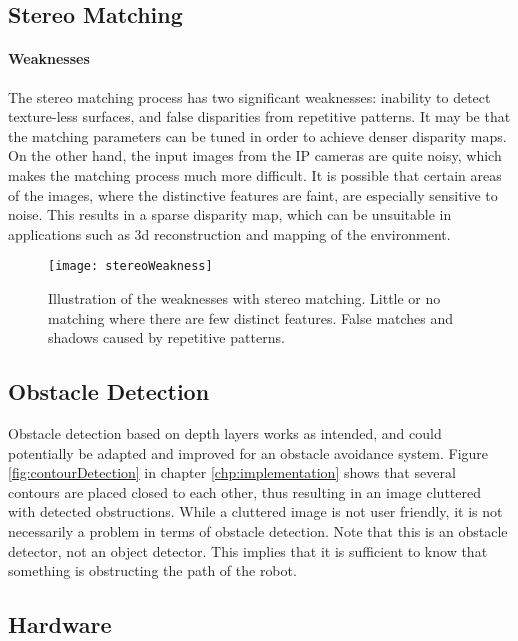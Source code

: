 \subsection{Stereo Matching}

\paragraph{Weaknesses}

The stereo matching process has two significant weaknesses: inability to detect texture-less surfaces, and false disparities from repetitive patterns. It may be that the matching parameters can be tuned in order to achieve denser disparity maps. On the other hand, the input images from the IP cameras are quite noisy, which makes the matching process much more difficult. It is possible that certain areas of the images, where the distinctive features are faint, are especially sensitive to noise. This results in a sparse disparity map, which can be unsuitable in applications such as 3d reconstruction and mapping of the environment.

\begin{figure}
	\texttt{[image: stereoWeakness]}
	\caption{Illustration of the weaknesses with stereo matching. Little or no matching where there are few distinct features. False matches and shadows caused by repetitive patterns.}
	\label{fig:stereoWeakness}
\end{figure}



\subsection{Obstacle Detection}

Obstacle detection based on depth layers works as intended, and could potentially be adapted and improved for an obstacle avoidance system. Figure \ref{fig:contourDetection} in chapter \ref{chp:implementation} shows that several contours are placed closed to each other, thus resulting in an image cluttered with detected obstructions. While a cluttered image is not user friendly, it is not necessarily a problem in terms of obstacle detection. Note that this is an obstacle detector, not an object detector. This implies that it is sufficient to know that something is obstructing the path of the robot. 

\subsection{Hardware}

